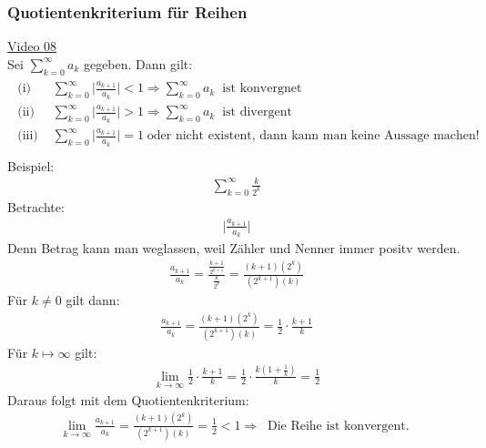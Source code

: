 \subsubsection{Quotientenkriterium für Reihen}
\href{https://youtu.be/6xdKQ09P7c4}{Video 08}\\
Sei $ \sum\limits_{k=0}^{\infty} a_k $ gegeben. Dann gilt:\\
\begin{align*}
\begin{array}{lll}
\text{(i) }&\sum\limits_{k=0}^{\infty}\big|\frac{a_{k+1}}{a_k}\big|<1\Rightarrow \sum\limits_{k=0}^{\infty}a_k \;\;\text{ist konvergnet }\\[15pt]%
\text{(ii) }&\sum\limits_{k=0}^{\infty}\big|\frac{a_{k+1}}{a_k}\big|>1\Rightarrow \sum\limits_{k=0}^{\infty}a_k \;\;\text{ist divergent }\\[15pt]%
\text{(iii) }&\sum\limits_{k=0}^{\infty}\big|\frac{a_{k+1}}{a_k}\big|=1\;\text{oder nicht existent, dann kann man keine Aussage machen! }\\[15pt]%
\end{array}
\end{align*}
Beispiel: \\
\begin{align*}
\sum\limits_{k=0}^{\infty}\frac{k}{2^k}
\end{align*}
Betrachte:\\
\begin{align*}
\bigg|\frac{a_{k+1}}{a_k}\bigg|
\end{align*}
Denn Betrag kann man weglassen, weil Zähler und Nenner immer  positv werden.\\
\begin{align*}
\frac{a_{k+1}}{a_k}=\frac{\frac{k+1}{2^{k+1}}}{\frac{k}{2^k}}=\frac{(k+1)(2^k)}{(2^{k+1})(k)}
\end{align*}
Für $ k\neq 0 $ gilt dann:\\
\begin{align*}
\frac{a_{k+1}}{a_k}=\frac{(k+1)(2^k)}{(2^{k+1})(k)}=\frac{1}{2}\cdot\frac{k+1}{k}
\end{align*}
Für $ k\mapsto\infty $ gilt:\\
\begin{align*}
\lim\limits_ {k\to\infty}\frac{1}{2}\cdot\frac{k+1}{k}=\frac{1}{2}\cdot\frac{k(1+\frac{1}{k})}{k}=\frac{1}{2}
\end{align*}
Daraus folgt mit dem Quotientenkriterium:\\
\begin{align*}
\lim\limits_ {k\to\infty}\frac{a_{k+1}}{a_k}=\frac{(k+1)(2^k)}{(2^{k+1})(k)}=\frac{1}{2}<1\Rightarrow \;\;\text{Die Reihe ist konvergent. }
\end{align*}
\newpage
\noindent
